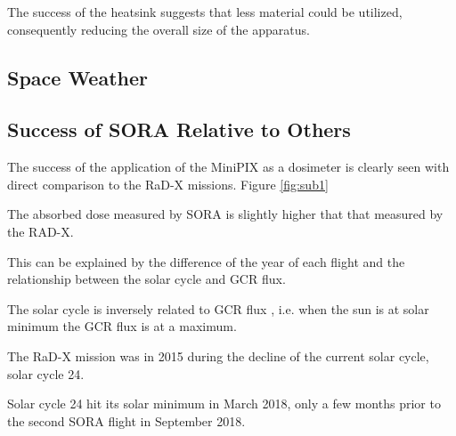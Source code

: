 The success of the heatsink suggests that less material could be utilized, consequently reducing the overall size of the apparatus.



\subsection{Space Weather}






\subsection{Success of SORA Relative to Others}


The success of the application of the MiniPIX as a dosimeter is clearly seen with direct comparison to the RaD-X missions. Figure \ref{fig:sub1}

The absorbed dose measured by SORA is slightly higher that that measured by the RAD-X.

This can be explained by the difference of the year of each flight and the relationship between the solar cycle and GCR flux.

The solar cycle is inversely related to GCR flux \cite{hathaway}, i.e. when the sun is at solar minimum the GCR flux is at a maximum.

The RaD-X mission was in 2015 during the decline of the current solar cycle, solar cycle \num{24}. 

Solar cycle 24 hit its solar minimum in March 2018, only a few months prior to the second SORA flight in September 2018.







